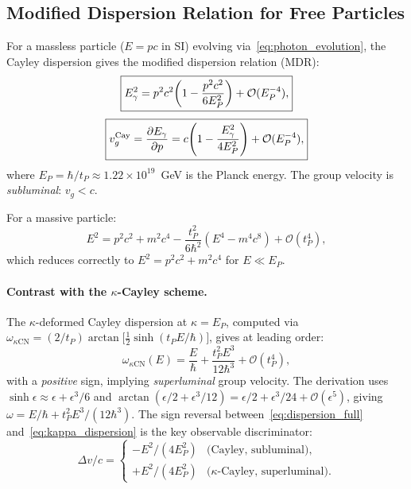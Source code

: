 \documentclass[12pt,a4paper]{article}
\begin{document}
\subsection{Modified Dispersion Relation for Free Particles}
\label{sec:mdr}

For a massless particle ($E = pc$ in SI) evolving via~\eqref{eq:photon_evolution}, the
Cayley dispersion gives the modified dispersion relation (MDR):
\begin{equation}
  \boxed{%
  E_\gamma^2 = p^2 c^2\!\left(1 - \frac{p^2 c^2}{6 E_P^2}\right) + \mathcal{O}(E_P^{-4}),
  }
  \label{eq:mdr_massless}
\end{equation}
\begin{equation}
  \boxed{%
  v_g^{\mathrm{Cay}} = \frac{\partial E_\gamma}{\partial p}
  = c\!\left(1 - \frac{E_\gamma^2}{4 E_P^2}\right) + \mathcal{O}(E_P^{-4}),
  }
  \label{eq:group_velocity}
\end{equation}
where $E_P = \hbar/t_P \approx 1.22 \times 10^{19}$~GeV is the Planck energy.
The group velocity is \emph{subluminal}: $v_g < c$.

For a massive particle:
\begin{equation}
  E^2 = p^2 c^2 + m^2 c^4
        - \frac{t_P^2}{6\hbar^2}\left(E^4 - m^4 c^8\right) + \mathcal{O}(t_P^4),
  \label{eq:mdr_massive}
\end{equation}
which reduces correctly to $E^2 = p^2 c^2 + m^2 c^4$ for $E \ll E_P$.

\paragraph{Contrast with the $\kappa$-Cayley scheme.}
The $\kappa$-deformed Cayley dispersion at $\kappa = E_P$, computed via
$\omega_{\kappa\mathrm{CN}} = (2/t_P)\arctan\bigl[\tfrac{1}{2}\sinh(t_P E/\hbar)\bigr]$,
gives at leading order:
\begin{equation}
  \omega_{\kappa\mathrm{CN}}(E) = \frac{E}{\hbar}
  + \frac{t_P^2 E^3}{12\hbar^3} + \mathcal{O}(t_P^4),
  \label{eq:kappa_dispersion}
\end{equation}
with a \emph{positive} sign, implying \emph{superluminal} group velocity.
The derivation uses $\sinh\epsilon \approx \epsilon + \epsilon^3/6$ and
$\arctan(\epsilon/2 + \epsilon^3/12) = \epsilon/2 + \epsilon^3/24 + \mathcal{O}(\epsilon^5)$,
giving $\omega = E/\hbar + t_P^2 E^3/(12\hbar^3)$.
The sign reversal between~\eqref{eq:dispersion_full} and~\eqref{eq:kappa_dispersion}
is the key observable discriminator:
\begin{equation}
  \Delta v / c = \begin{cases}
    -E^2/(4E_P^2) & \text{(Cayley, subluminal)}, \\
    +E^2/(4E_P^2) & \text{($\kappa$-Cayley, superluminal)}.
  \end{cases}
  \label{eq:sign_discriminator}
\end{equation}
\end{document}
